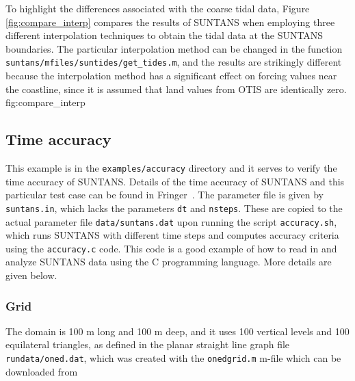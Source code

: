 To highlight the differences associated with the coarse tidal data, Figure \ref{fig:compare_interp} compares
the results of SUNTANS when employing three different interpolation techniques to obtain the tidal data
at the SUNTANS boundaries.  The particular interpolation method can be changed in the function \verb+suntans/mfiles/suntides/get_tides.m+,
and the results are strikingly different because the interpolation method has a significant effect on
forcing values near the coastline, since it is assumed that land values from OTIS are identically zero.
{fig:compare_interp}


\subsection{Time accuracy} \label{sec:timeaccuracy}

This example is in the \verb+examples/accuracy+ directory and it
serves to verify the time accuracy of SUNTANS.  Details of the time accuracy
of SUNTANS and this particular test case can be found in Fringer\etal~\cite{FRINGER[2005]}.
The parameter file is given by
\verb+suntans.in+, which lacks the parameters \verb+dt+ and \verb+nsteps+.  These
are copied to the actual parameter file \verb+data/suntans.dat+ upon running the
script \verb+accuracy.sh+, which runs SUNTANS with different time steps and computes
accuracy criteria using the \verb+accuracy.c+ code.  This code is a good example
of how to read in and analyze SUNTANS data using the C programming language.  More
details are given below.

\subsubsection{Grid}

The domain is 100 m long and 100 m deep, and it
uses 100 vertical levels and 100 equilateral triangles, as defined in the planar
straight line graph file \verb+rundata/oned.dat+, which was created with the
\verb+onedgrid.m+ m-file which can be downloaded from 

